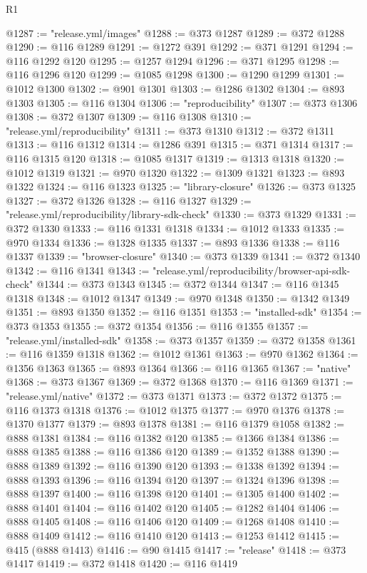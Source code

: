 \begin{lexlean}{R1}
\begin{coremodule}
@1287 := "release.yml/images"
@1288 := @373 @1287
@1289 := @372 @1288
@1290 := @116 @1289
@1291 := @1272 @391
@1292 := @371 @1291
@1294 := @116 @1292 @120
@1295 := @1257 @1294
@1296 := @371 @1295
@1298 := @116 @1296 @120
@1299 := @1085 @1298
@1300 := @1290 @1299
@1301 := @1012 @1300
@1302 := @901 @1301
@1303 := @1286 @1302
@1304 := @893 @1303
@1305 := @116 @1304
@1306 := "reproducibility"
@1307 := @373 @1306
@1308 := @372 @1307
@1309 := @116 @1308
@1310 := "release.yml/reproducibility"
@1311 := @373 @1310
@1312 := @372 @1311
@1313 := @116 @1312
@1314 := @1286 @391
@1315 := @371 @1314
@1317 := @116 @1315 @120
@1318 := @1085 @1317
@1319 := @1313 @1318
@1320 := @1012 @1319
@1321 := @970 @1320
@1322 := @1309 @1321
@1323 := @893 @1322
@1324 := @116 @1323
@1325 := "library-closure"
@1326 := @373 @1325
@1327 := @372 @1326
@1328 := @116 @1327
@1329 := "release.yml/reproducibility/library-sdk-check"
@1330 := @373 @1329
@1331 := @372 @1330
@1333 := @116 @1331 @1318
@1334 := @1012 @1333
@1335 := @970 @1334
@1336 := @1328 @1335
@1337 := @893 @1336
@1338 := @116 @1337
@1339 := "browser-closure"
@1340 := @373 @1339
@1341 := @372 @1340
@1342 := @116 @1341
@1343 := "release.yml/reproducibility/browser-api-sdk-check"
@1344 := @373 @1343
@1345 := @372 @1344
@1347 := @116 @1345 @1318
@1348 := @1012 @1347
@1349 := @970 @1348
@1350 := @1342 @1349
@1351 := @893 @1350
@1352 := @116 @1351
@1353 := "installed-sdk"
@1354 := @373 @1353
@1355 := @372 @1354
@1356 := @116 @1355
@1357 := "release.yml/installed-sdk"
@1358 := @373 @1357
@1359 := @372 @1358
@1361 := @116 @1359 @1318
@1362 := @1012 @1361
@1363 := @970 @1362
@1364 := @1356 @1363
@1365 := @893 @1364
@1366 := @116 @1365
@1367 := "native"
@1368 := @373 @1367
@1369 := @372 @1368
@1370 := @116 @1369
@1371 := "release.yml/native"
@1372 := @373 @1371
@1373 := @372 @1372
@1375 := @116 @1373 @1318
@1376 := @1012 @1375
@1377 := @970 @1376
@1378 := @1370 @1377
@1379 := @893 @1378
@1381 := @116 @1379 @1058
@1382 := @888 @1381
@1384 := @116 @1382 @120
@1385 := @1366 @1384
@1386 := @888 @1385
@1388 := @116 @1386 @120
@1389 := @1352 @1388
@1390 := @888 @1389
@1392 := @116 @1390 @120
@1393 := @1338 @1392
@1394 := @888 @1393
@1396 := @116 @1394 @120
@1397 := @1324 @1396
@1398 := @888 @1397
@1400 := @116 @1398 @120
@1401 := @1305 @1400
@1402 := @888 @1401
@1404 := @116 @1402 @120
@1405 := @1282 @1404
@1406 := @888 @1405
@1408 := @116 @1406 @120
@1409 := @1268 @1408
@1410 := @888 @1409
@1412 := @116 @1410 @120
@1413 := @1253 @1412
@1415 := @415 (@888 @1413)
@1416 := @90 @1415
@1417 := "release"
@1418 := @373 @1417
@1419 := @372 @1418
@1420 := @116 @1419

\end{coremodule}
\end{lexlean}
